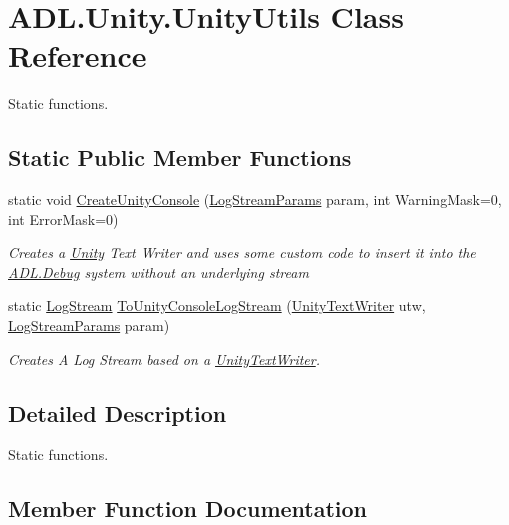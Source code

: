 \hypertarget{class_a_d_l_1_1_unity_1_1_unity_utils}{}\section{A\+D\+L.\+Unity.\+Unity\+Utils Class Reference}
\label{class_a_d_l_1_1_unity_1_1_unity_utils}


Static functions.  


\subsection*{Static Public Member Functions}
\begin{DoxyCompactItemize}
\item 
static void \mbox{\hyperlink{class_a_d_l_1_1_unity_1_1_unity_utils_aab77fbb5a3a417ac486ed3838bc4d941}{Create\+Unity\+Console}} (\mbox{\hyperlink{class_a_d_l_1_1_unity_1_1_log_stream_params}{Log\+Stream\+Params}} param, int Warning\+Mask=0, int Error\+Mask=0)
\begin{DoxyCompactList}\small\item\em Creates a \mbox{\hyperlink{namespace_a_d_l_1_1_unity}{Unity}} Text Writer and uses some custom code to insert it into the \mbox{\hyperlink{class_a_d_l_1_1_debug}{A\+D\+L.\+Debug}} system without an underlying stream \end{DoxyCompactList}\item 
static \mbox{\hyperlink{class_a_d_l_1_1_log_stream}{Log\+Stream}} \mbox{\hyperlink{class_a_d_l_1_1_unity_1_1_unity_utils_a2d9a234cdee1d96c7ef8ff9e547118c3}{To\+Unity\+Console\+Log\+Stream}} (\mbox{\hyperlink{class_a_d_l_1_1_unity_1_1_unity_text_writer}{Unity\+Text\+Writer}} utw, \mbox{\hyperlink{class_a_d_l_1_1_unity_1_1_log_stream_params}{Log\+Stream\+Params}} param)
\begin{DoxyCompactList}\small\item\em Creates A Log Stream based on a \mbox{\hyperlink{class_a_d_l_1_1_unity_1_1_unity_text_writer}{Unity\+Text\+Writer}}. \end{DoxyCompactList}\end{DoxyCompactItemize}


\subsection{Detailed Description}
Static functions. 



\subsection{Member Function Documentation}
\mbox{\label{class_a_d_l_1_1_unity_1_1_unity_utils_aab77fbb5a3a417ac486ed3838bc4d941}} 
